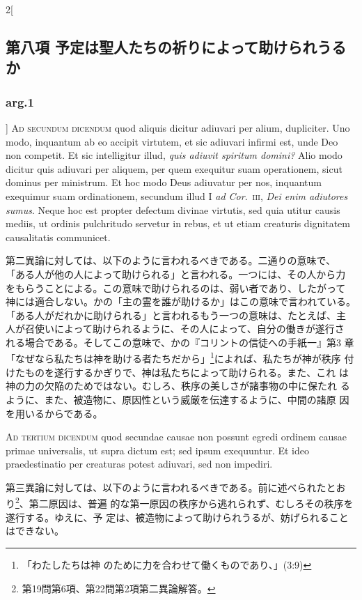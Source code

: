 \documentclass[paper=a4paper,fontsize=10pt,jafontsize=9pt,titlepage]{jlreq}
\begin{document}
\begin{paracol}{2}[\subsection{第八項 予定は聖人たちの祈りによって助けられうるか}\subsubsection{arg.1}]
{\scshape Ad secundum dicendum} quod aliquis dicitur
adiuvari per alium, dupliciter. Uno modo, inquantum ab eo accipit
virtutem, et sic adiuvari infirmi est, unde Deo non competit. Et sic
intelligitur illud, {\itshape quis adiuvit spiritum domini?} Alio modo dicitur quis
adiuvari per aliquem, per quem exequitur suam operationem, sicut dominus
per ministrum. Et hoc modo Deus adiuvatur per nos, inquantum exequimur
suam ordinationem, secundum illud I {\itshape ad Cor}.~{\scshape iii}, {\itshape Dei enim adiutores
sumus}. Neque hoc est propter defectum divinae virtutis, sed quia utitur
causis mediis, ut ordinis pulchritudo servetur in rebus, et ut etiam
creaturis dignitatem causalitatis communicet.


\switchcolumn


第二異論に対しては、以下のように言われるべきである。二通りの意味で、
「ある人が他の人によって助けられる」と言われる。一つには、その人から力
をもらうことによる。この意味で助けられるのは、弱い者であり、したがって
神には適合しない。かの「主の霊を誰が助けるか」はこの意味で言われている。
「ある人がだれかに助けられる」と言われるもう一つの意味は、たとえば、主
人が召使いによって助けられるように、その人によって、自分の働きが遂行さ
れる場合である。そしてこの意味で、かの『コリントの信徒への手紙一』第3
章「なぜなら私たちは神を助ける者たちだから」\footnote{「わたしたちは神
のために力を合わせて働くものであり、」(3:9)}によれば、私たちが神が秩序
付けたものを遂行するかぎりで、神は私たちによって助けられる。また、これ
は神の力の欠陥のためではない。むしろ、秩序の美しさが諸事物の中に保たれ
るように、また、被造物に、原因性という威厳を伝達するように、中間の諸原
因を用いるからである。


\switchcolumn*[\subsubsection{ad.3}]


{\scshape Ad tertium dicendum} quod secundae causae non
possunt egredi ordinem causae primae universalis, ut supra dictum est;
sed ipsum exequuntur. Et ideo praedestinatio per creaturas potest
adiuvari, sed non impediri.


\switchcolumn


第三異論に対しては、以下のように言われるべきである。前に述べられたとお
り\footnote{第19問第6項、第22問第2項第二異論解答。}、第二原因は、普遍
的な第一原因の秩序から逃れられず、むしろその秩序を遂行する。ゆえに、予
定は、被造物によって助けられうるが、妨げられることはできない。


\switchcolumn*



\end{paracol}
\end{document}
